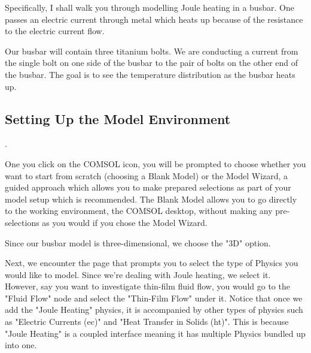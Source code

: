 Specifically, I shall walk you through modelling Joule heating in a busbar. One passes an electric current through metal which heats up because of the resistance to the electric current flow.

Our busbar will contain three titanium bolts. We are conducting a current from the single bolt on one side of the busbar to the pair of bolts on the other end of the busbar. The goal is to see the temperature distribution as the busbar heats up.



\subsection{Setting Up the Model Environment}.

One you click on the COMSOL icon, you will be prompted to choose whether you want to start from scratch (choosing a Blank Model) or the Model Wizard, a guided approach which allows you to make prepared selections as part of your model setup which is recommended. The Blank Model allows you to go directly to the working environment, the COMSOL desktop, without making any pre-selections as you would if you chose the Model Wizard.


Since our busbar model is three-dimensional, we choose the "3D" option.


Next, we encounter the page that prompts you to select the type of Physics you would like to model. Since we're dealing with Joule heating, we select it. However, say you want to investigate thin-film fluid flow, you would go to the "Fluid Flow" node and select the "Thin-Film Flow" under it. Notice that once we add the "Joule Heating" physics, it is accompanied by other types of physics such as "Electric Currents (ec)" and "Heat Transfer in Solids (ht)". This is because "Joule Heating" is a coupled interface meaning it has multiple Physics bundled up into one.

